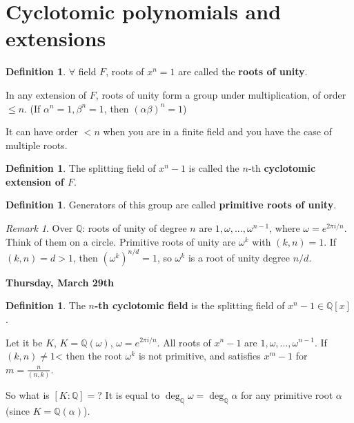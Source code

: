 \documentclass[9pt,reqno,twoside]{amsbook}
\theoremstyle{plain}
\numberwithin{section}{chapter}
\numberwithin{equation}{chapter}
\theoremstyle{definition}
\newtheorem{Def}[theorem]{Definition}
\theoremstyle{remark}
\newtheorem{rem}[theorem]{Remark}
\theoremstyle{plain}
\newcommand{\Q}{\mathbb{Q}}
\newcommand{\bb}{\vspace{3mm}}
\newcommand{\fracc}{\frac}
\renewcommand{\leq}{\leqslant}
\begin{document}
\setcounter{section}{5}

\section{Cyclotomic polynomials and extensions}

\begin{Def} 
$\forall$ field $F$, roots of $x^n = 1$ are called the \textbf{roots of unity}. 
\end{Def}

In any extension of $F$, roots of unity form a group under multiplication, of order $\leq n$. (If $\alpha^n = 1, \beta^n = 1$, then $(\alpha\beta)^n = 1$)

It can have order $< n$ when you are in a finite field and you have the case of multiple roots. 

\begin{Def}
The splitting field of $x^n - 1$ is called the $n$-th \textbf{cyclotomic extension of $F$}. 
\end{Def}

\begin{Def}
Generators of this group are called \textbf{primitive roots of unity}. 
\end{Def}

\begin{rem}
Over $\Q$: roots of unity of degree $n$ are $1,\omega,...,\omega^{n - 1}$, where $\omega = e^{2\pi i/n}$. Think of them on a circle. Primitive roots of unity are $\omega^k$ with $(k,n) = 1$. If $(k,n) = d > 1$, then $(\omega^{k})^{n / d} = 1$, so $\omega^k$ is a root of unity degree $n/d$. 
\end{rem}

\bb

\textbf{Thursday, March 29th}

\begin{Def}
The \textbf{$n$-th cyclotomic field} is the splitting field of $x^n - 1 \in \Q[x]$. 
\end{Def}

Let it be $K$, $K = \Q(\omega)$, $\omega = e^{2\pi i/n}$. All roots of $x^n - 1$ are $1,\omega,...,\omega^{n - 1}$. If $(k,n) \neq 1$< then the root $\omega^k$ is not primitive, and satisfies $x^m - 1$ for $m  = \fracc{n}{(n,k)}$. 


So what is $[K:\Q] = $? It is equal to $\deg_\Q\omega = \deg_\Q \alpha$ for any primitive root $\alpha$ (since $K = \Q(\alpha)$). 
\end{document}
